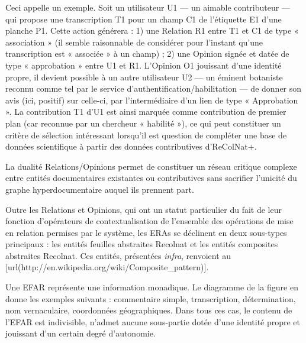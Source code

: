 Ceci appelle un exemple.
Soit un utilisateur U1 --- un aimable contributeur --- qui propose une transcription T1 pour un champ C1 de l'étiquette E1 d'une planche P1.
Cette action générera :
1) une Relation R1 entre T1 et C1 de type « association » (il semble raisonnable de considérer pour l'instant qu'une transcription est « associée » à un champ) ;
2) une Opinion signée et datée de type « approbation » entre U1 et R1.
L'Opinion O1 jouissant d'une identité propre, il devient possible à un autre utilisateur U2 --- un éminent botaniste reconnu comme tel par le service d'authentification/habilitation --- de donner son avis (ici, positif) sur celle-ci, par l'intermédiaire d'un lien de type « Approbation ».
La contribution T1 d'U1 est ainsi marquée comme contribution de premier plan (car reconnue par un chercheur « habilité »), ce qui peut constituer un critère de sélection intéressant lorsqu'il est question de compléter une base de données scientifique à partir des données contributives d'ReColNat+.

La dualité Relations/Opinions permet de constituer un réseau critique complexe entre entités documentaires existantes ou contributives sans sacrifier l'unicité du graphe hyperdocumentaire auquel ils prennent part.

\stopsection
\startsection[title={Sous-types d'ERAs}]

Outre les Relations et Opinions, qui ont un statut particulier du fait de leur fonction d'opérateurs de contextualisation de l'ensemble des opérations de mise en relation permises par le système, les ERAs se déclinent en deux sous-types principaux : les entités feuilles abstraites Recolnat et les entités composites abstraites Recolnat.
Ces entités, présentées {\it infra}, renvoient au [url(http://en.wikipedia.org/wiki/Composite_pattern)].

\startsubsection[title={Entité feuille abstraite Recolnat (EFAR)}]

Une EFAR représente une information monadique.
Le diagramme de la figure  en donne les exemples suivants : commentaire simple, transcription, détermination, nom vernaculaire, coordonnées géographiques.
Dans tous ces cas, le contenu de l'EFAR est indivisible, n'admet aucune sous-partie dotée d'une identité propre et jouissant d'un certain degré d'autonomie.

